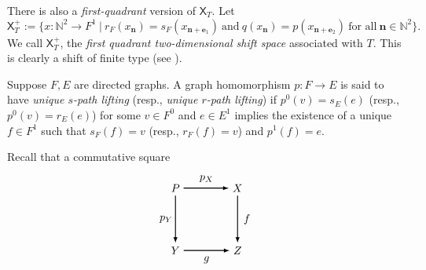 \documentclass[a4paper,reqno,12pt]{amsart}
\newcommand{\Xs}{\mathsf{X}}
\theoremstyle{definition}
\theoremstyle{remark}
\begin{document}
There is also a \emph{first-quadrant} version of $\mathsf{X}_T$. Let \[\mathsf{X}_T^+:=\{x:\mathbb{N}^2\longrightarrow F^1~|~r_F(x_\mathbf{n})=s_F(x_{\mathbf{n}+\mathbf{e}_1})~\text{and}~q(x_\mathbf{n})=p(x_{\mathbf{n}+\mathbf{e}_2})~\text{for all}~\mathbf{n}\in \mathbb{N}^2\}.\] We call $\Xs_T^+$, the \emph{first quadrant two-dimensional shift space} associated with $T$. This is clearly a shift of finite type (see \cite{BGGLPP}). 

Suppose $F,E$ are directed graphs. A graph homomorphism $p:F\longrightarrow E$ is said to have \emph{unique $s$-path lifting} (resp., \emph{unique $r$-path lifting}) if  $p^0(v)=s_E(e)$ (resp., $p^0(v)=r_E(e)$) for some $v\in F^0$ and $e\in E^1$ implies the existence of a unique $f\in F^1$ such that $s_F(f)=v$ (resp., $r_F(f)=v$) and $p^1(f)=e$.

Recall that a commutative square 
\[
\begin{tikzpicture}[scale=1.0]
\node[] (A1) at (0,0) {$P$};
\node[] (A2) at (2,0) {$X$};

\node[] (B1) at (0,-2) {$Y$};
\node[] (B2) at (2,-2) {$Z$};


\path[->, >=latex,thick] (A1) edge [] node[]{} (A2);
\path[->, >=latex,thick] (B1) edge [] node[]{} (B2);

\path[->, >=latex,thick] (A1) edge [] node[]{} (B1);
\path[->, >=latex,thick] (A2) edge [] node[]{} (B2);

\node at (1,0.3) {$p_X$};
\node at (1,-2.3) {$g$};

\node at (-0.3,-1) {$p_Y$};
\node at (2.3,-1) {$f$};
\end{tikzpicture}
\]
\end{document}
